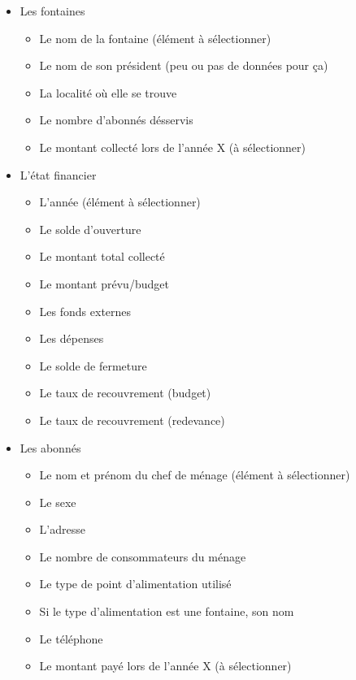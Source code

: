 \documentclass[a4paper, 11pt]{article}
\begin{document}
\begin{itemize}
    \item Les fontaines
    \begin{itemize}
        \item Le nom de la fontaine (élément à sélectionner)
        \item Le nom de son président (peu ou pas de données pour ça)
        \item La localité où elle se trouve
        \item Le nombre d'abonnés désservis
        \item Le montant collecté lors de l'année X (à sélectionner)
    \end{itemize}
    \item L'état financier
    \begin{itemize}
        \item L'année (élément à sélectionner)
        \item Le solde d'ouverture
        \item Le montant total collecté
        \item Le montant prévu/budget
        \item Les fonds externes
        \item Les dépenses
        \item Le solde de fermeture
        \item Le taux de recouvrement (budget)
        \item Le taux de recouvrement (redevance)
    \end{itemize}
    \item Les abonnés
    \begin{itemize}
        \item Le nom et prénom du chef de ménage (élément à sélectionner)
        \item Le sexe
        \item L'adresse
        \item Le nombre de consommateurs du ménage
        \item Le type de point d'alimentation utilisé
        \item Si le type d'alimentation est une fontaine, son nom
        \item Le téléphone
        \item Le montant payé lors de l'année X (à sélectionner)
    \end{itemize}
\end{itemize}
\end{document}
